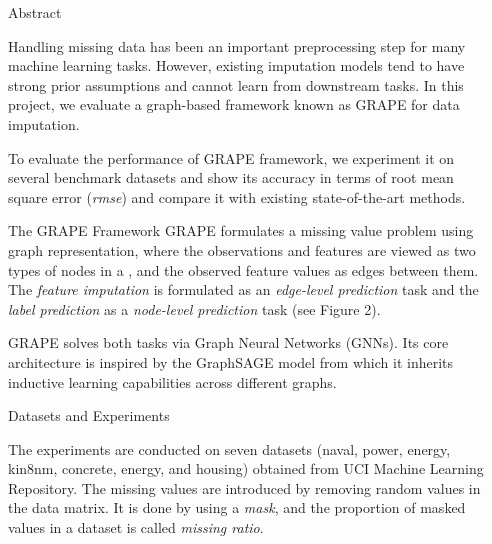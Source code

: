 \documentclass[final]{beamer}
\newlength{\sepwidth}
\newlength{\colwidth}
\newcommand{\separatorcolumn}{\begin{column}{\sepwidth}\end{column}}
\begin{document}
\begin{frame}[t]
\hspace{2cm}
\begin{columns}[t]
\separatorcolumn
\begin{column}{\colwidth}
  \begin{block}{Abstract}

Handling missing data has been an important preprocessing step for many machine learning tasks. However, existing imputation models tend to have strong prior assumptions and cannot learn from downstream tasks. In this project, we evaluate a graph-based framework known as GRAPE for data imputation.

To evaluate the performance of GRAPE framework, we experiment it on several benchmark datasets and show its accuracy in terms of root mean square error (\textit{rmse}) and compare it with existing state-of-the-art methods. 

  \end{block}

  \begin{block}{The GRAPE Framework}
GRAPE formulates a missing value problem using graph representation, where the observations and features are viewed as two types of nodes in a , and the observed feature values as edges between them. The \textit{feature imputation} is formulated as an \textit{edge-level prediction} task and the \textit{label prediction} as a \textit{node-level prediction} task (see Figure 2).

GRAPE solves both tasks via Graph Neural Networks (GNNs). Its core architecture is inspired by the GraphSAGE model from which it inherits inductive learning capabilities across different graphs.


  \end{block}

  \begin{block}{Datasets and Experiments}
  
The experiments are conducted on seven datasets (naval, power, energy, kin8nm, concrete, energy, and housing) obtained from UCI Machine Learning Repository. The missing values are introduced by removing random values in the data matrix. It is done by using a \textit{mask}, and the proportion of masked values in a dataset is called \textit{missing ratio}.


\end{block}
\end{column}
\end{columns}
\end{frame}
\end{document}
